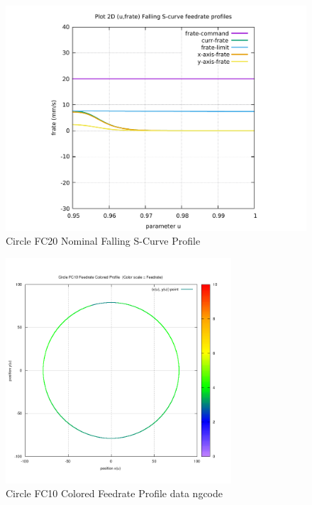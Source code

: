 \begin{figure}
	\caption     {Circle FC20 Nominal Falling S-Curve Profile}
	\label{16-img-Circle-FC20-Nominal-Falling-S-Curve-Profile.pdf}
	\includegraphics[width=1.00\textwidth]{Chap4/appendix/app-Circle/plots/16-img-Circle-FC20-Nominal-Falling-S-Curve-Profile.pdf}
\end{figure}

\clearpage
\pagebreak

\begin{figure}
	\caption     {Circle FC10 Colored Feedrate Profile data ngcode}
	\label{17-img-Circle-FC10-Colored-Feedrate-Profile-data_ngcode.png}
	\includegraphics[width=0.75\textwidth]{Chap4/appendix/app-Circle/plots/17-img-Circle-FC10-Colored-Feedrate-Profile-data_ngcode.png}
\end{figure}


